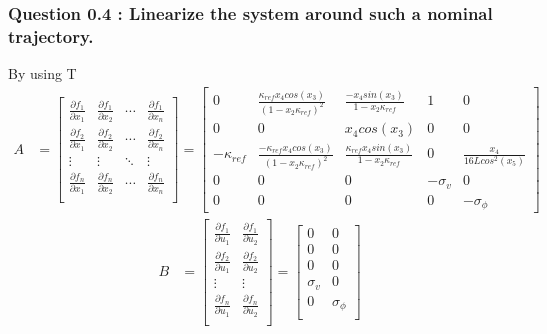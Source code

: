 \subsubsection*{Question 0.4 : Linearize the system around such a nominal trajectory.}
By using T
\begin{align}
    A &= 
    \left[ {\begin{array}{cccc}
        \frac{\partial f_1}{\partial x_1} & \frac{\partial f_1}{\partial x_2} & \cdots & \frac{\partial f_1}{\partial x_n}\\
        \frac{\partial f_2}{\partial x_1} & \frac{\partial f_2}{\partial x_2} & \cdots & \frac{\partial f_2}{\partial x_n}\\
        \vdots & \vdots & \ddots & \vdots\\
        \frac{\partial f_n}{\partial x_1} & \frac{\partial f_n}{\partial x_2} & \cdots & \frac{\partial f_n}{\partial x_n}\\
    \end{array} } \right] = 
    \left[ {\begin{array}{ccccc}
        0 &\frac{\kappa_{ref} x_4 cos(x_3)}{(1 -x_2\kappa_{ref})^2} &\frac{-x_4sin(x_3)}{1-x_2\kappa_{ref}} &1 &0 \\
        0 &0 &x_4cos(x_3) &0 &0\\
        -\kappa_{ref} &\frac{-\kappa_{ref}x_4 cos(x_3)}{(1 - x_2\kappa_{ref})^2} &\frac{\kappa_{ref}x_4 sin(x_3)}{1 - x_2\kappa_{ref}} &0 & \frac{x_4}{16 L cos^2(x_5)}\\
        0 &0 &0 &-\sigma_v &0\\
        0 &0 &0 &0 &-\sigma_{\phi}
    \end{array} } \right]
\end{align}
\begin{align}
    B &= 
    \left[ {\begin{array}{cc}
        \frac{\partial f_1}{\partial u_1} & \frac{\partial f_1}{\partial u_2}\\
        \frac{\partial f_2}{\partial u_1} & \frac{\partial f_2}{\partial u_2}\\
        \vdots & \vdots \\
        \frac{\partial f_n}{\partial u_1} & \frac{\partial f_n}{\partial u_2}\\
    \end{array} } \right]
    = 
    \left[ {\begin{array}{cc}
        0 &0\\
        0 &0\\
        0 &0\\
        \sigma_v &0\\
        0 &\sigma_{\phi}\\
    \end{array} } \right]
\end{align}



